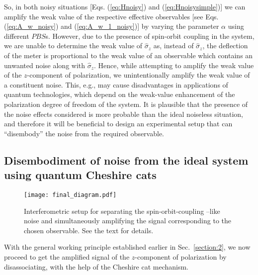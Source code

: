 \documentclass[aps,pra,showpacs,twoside,twocolumn,10pt]{revtex4-1}
\begin{document}
So, in both noisy situations [Eqs. (\ref{eq:Hnoisy}) and (\ref{eq:Hnoisysimple})] we can amplify the weak value of the respective effective observables [see Eqs. (\ref{eq:A_w_noisy}) and (\ref{eq:A_w_1_noisy})] by varying the parameter $\alpha$ using different $PBS$s. However, due to the presence of spin-orbit coupling in the system, we are unable to determine the weak value of $\hat{\sigma}_z$ as, %
instead of $\hat{\sigma}_z$, the deflection of the meter is proportional to the weak value of an observable which contains an unwanted noise along with $\hat{\sigma}_z$. Hence, while attempting to amplify the weak value of the $z$-component of polarization,
we unintentionally amplify the weak value of a constituent noise. This, e.g., may cause disadvantages in  applications of quantum technologies, which depend on the weak-value enhancement of the polarization degree of freedom of the system. It is plausible that the presence of the noise effects considered is more probable than the ideal noiseless situation, and therefore it will be beneficial to design an experimental setup that can ``disembody'' the noise from the required observable.

\subsection{Disembodiment of noise from the ideal system using quantum Cheshire cats %
}
\label{section:5}



\begin{figure}
\texttt{[image: final\_diagram.pdf]}
\caption{
Interferometric setup for separating the spin-orbit-coupling --like noise and simultaneously amplifying the signal corresponding to the chosen observable. See the text for details.
}
\label{fig3}
\end{figure}    

  With the general working principle established earlier in Sec.~\ref{section:2}, we now proceed to get %
  the amplified signal
  of the $z$-component of polarization by disassociating, with the help of the Cheshire cat mechanism. %
   
\end{document}
